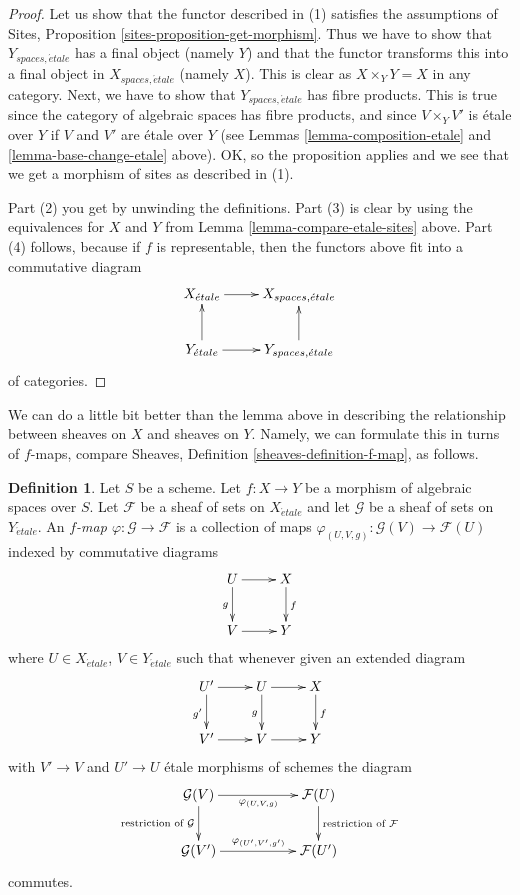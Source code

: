 \documentclass{stacks-project}
\theoremstyle{plain}
\theoremstyle{definition}
\newtheorem{definition}[subsection]{Definition}
\theoremstyle{remark}
\numberwithin{equation}{subsection}
\def\etale{{\acute{e}tale}}
\begin{document}
\begin{proof}
Let us show that the functor described in (1) satisfies the assumptions
of Sites, Proposition \ref{sites-proposition-get-morphism}.
Thus we have to show that
$Y_{spaces, \etale}$ has a final object (namely $Y$) and that
the functor transforms this into a final object in $X_{spaces, \etale}$
(namely $X$). This is clear as $X \times_Y Y = X$ in any category.
Next, we have to show that $Y_{spaces, \etale}$ has fibre products.
This is true since the category of algebraic spaces has fibre products,
and since $V \times_Y V'$ is \'etale over $Y$ if $V$ and $V'$ are \'etale
over $Y$ (see Lemmas \ref{lemma-composition-etale} and
\ref{lemma-base-change-etale} above).
OK, so the proposition applies and we see that we get a morphism
of sites as described in (1).

\medskip\noindent
Part (2) you get by unwinding the definitions.
Part (3) is clear by using the equivalences for $X$ and $Y$
from Lemma \ref{lemma-compare-etale-sites} above.
Part (4) follows, because if $f$ is representable, then the
functors above fit into a commutative diagram
$$
\xymatrix{
X_\etale \ar[r] &
X_{spaces, \etale} \\
Y_\etale \ar[r] \ar[u] &
Y_{spaces, \etale} \ar[u]
}
$$
of categories.
\end{proof}

\noindent
We can do a little bit better than the lemma above in describing
the relationship between sheaves on $X$ and sheaves on $Y$.
Namely, we can formulate this in turns of $f$-maps, compare
Sheaves, Definition \ref{sheaves-definition-f-map}, as follows.

\begin{definition}
\label{definition-f-map}
Let $S$ be a scheme.
Let $f : X \to Y$ be a morphism of algebraic spaces over $S$.
Let $\mathcal{F}$ be a sheaf of sets on $X_\etale$ and
let $\mathcal{G}$ be a sheaf of sets on $Y_\etale$.
An {\it $f$-map $\varphi : \mathcal{G} \to \mathcal{F}$}
is a collection of maps
$\varphi_{(U, V, g)} : \mathcal{G}(V) \to \mathcal{F}(U)$
indexed by commutative diagrams
$$
\xymatrix{
U \ar[d]_g \ar[r] & X \ar[d]^f \\
V \ar[r] & Y
}
$$
where $U \in X_\etale$, $V \in Y_\etale$ such that whenever
given an extended diagram
$$
\xymatrix{
U' \ar[r] \ar[d]_{g'} & U \ar[d]_g \ar[r] & X \ar[d]^f \\
V' \ar[r] & V \ar[r] & Y
}
$$
with $V' \to V$ and $U' \to U$ \'etale morphisms of schemes the diagram
$$
\xymatrix{
\mathcal{G}(V)
\ar[rr]_{\varphi_{(U, V, g)}}
\ar[d]_{\text{restriction of }\mathcal{G}} & &
\mathcal{F}(U)
\ar[d]^{\text{restriction of }\mathcal{F}} \\
\mathcal{G}(V')
\ar[rr]^{\varphi_{(U', V', g')}} & &
\mathcal{F}(U')
}
$$
commutes.
\end{definition}
\end{document}

